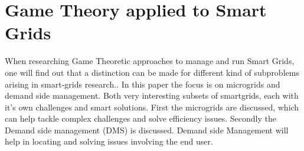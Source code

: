 \section{Game Theory applied to Smart Grids}
When researching Game Theoretic approaches to manage and run Smart Grids, one will find out that a distinction can be made for different kind of subproblems arising in smart-grids research.\cite{keypaper}. In this paper the focus is on microgrids and demand side management. Both very interesting subsets of smartgrids, each with it's own challenges and smart solutions. First the microgrids are discussed, which can help tackle complex challenges and solve efficiency issues. Secondly the Demand side management (DMS) is discussed. Demand side Management will help in locating and solving issues involving the end user. 